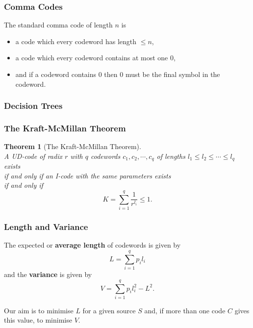 \documentclass{article}
\newtheorem{theorem}{Theorem}[section]
\begin{document}
\subsubsection{Comma Codes}

The standard comma code of length $n$ is

\begin{itemize}
    \item a code which every codeword has length $\leq n$,
    \item a code which every codeword contains at most one $0$,
    \item and if a codeword contains $0$ then $0$ must be the final symbol in the codeword.
\end{itemize}

\subsubsection{Decision Trees}

\subsubsection{The Kraft-McMillan Theorem}

\begin{theorem}[The Kraft-McMillan Theorem]
    \mbox{}\\
    A UD-code of radix $r$ with $q$ codewords $c_{1}, c_{2},\cdots,c_{q}$ of lengths $l_{1} \leq l_{2} \leq \cdots \leq l_{q}$ exists \\
    if and only if \qquad an I-code with the same parameters exists \\
    if and only if
    \[K=\sum_{i=1}^{q}\dfrac{1}{r^{l_{i}}}\leq1.\]
\end{theorem}

\subsubsection{Length and Variance}

The expected or \textbf{average length} of codewords is given by
    \[L=\sum_{i=1}^{q}p_{i}l_{i}\]
    and the \textbf{variance} is given by
    \[V=\sum_{i=1}^{q}p_{i}l_{i}^{2}-L^{2}.\]

Our aim is to minimise $L$ for a given source $S$ and, if more than one code $C$ gives this value, to minimise $V$.
\end{document}

